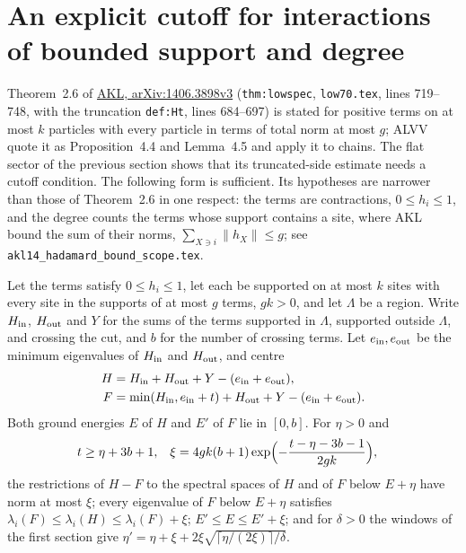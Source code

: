 \documentclass{article}
\begin{document}
\section{An explicit cutoff for interactions of bounded support and degree}

Theorem~2.6 of
\href{https://arxiv.org/pdf/1406.3898}{AKL, arXiv:1406.3898v3}
(\texttt{thm:lowspec}, \texttt{low70.tex}, lines 719--748, with the truncation
\texttt{def:Ht}, lines 684--697) is stated for positive terms on at most $k$
particles with every particle in terms of total norm at most $g$; ALVV quote it
as Proposition~4.4 and Lemma~4.5 and apply it to chains. The flat sector of
the previous section shows that its truncated-side estimate needs a cutoff
condition. The following form is sufficient. Its hypotheses are narrower than
those of Theorem~2.6 in one respect: the terms are contractions, $0\le h_i\le1$, and
the degree counts the terms whose support contains a site, where AKL bound the sum
of their norms, $\sum_{X\ni i}\lVert h_X\rVert\le g$; see
\texttt{akl14\_hadamard\_bound\_scope.tex}.

Let the terms satisfy $0\le h_i\le1$, let each be supported on at most $k$
sites with every site in the supports of at most $g$ terms, $gk>0$, and let
$\Lambda$ be a region. Write $H_{\rm in}$, $H_{\rm out}$ and $Y$ for the sums
of the terms supported in $\Lambda$, supported outside $\Lambda$, and
crossing the cut, and $b$ for the number of crossing terms. Let
$e_{\rm in},e_{\rm out}$ be the minimum eigenvalues of $H_{\rm in}$ and
$H_{\rm out}$, and centre
\begin{align*}
    H & =H_{\rm in}+H_{\rm out}+Y-(e_{\rm in}+e_{\rm out}), \\
    F & =\min(H_{\rm in},e_{\rm in}+t)+H_{\rm out}+Y-(e_{\rm in}+e_{\rm out}).
\end{align*}
Both ground energies $E$ of $H$ and $E'$ of $F$ lie in $[0,b]$. For $\eta>0$
and
\begin{align*}
    t & \ge\eta+3b+1, &
    \xi & =4gk(b+1)\exp\Bigl(-\frac{t-\eta-3b-1}{2gk}\Bigr),
\end{align*}
the restrictions of $H-F$ to the spectral spaces of $H$ and of $F$ below
$E+\eta$ have norm at most $\xi$; every eigenvalue of $F$ below $E+\eta$
satisfies $\lambda_i(F)\le\lambda_i(H)\le\lambda_i(F)+\xi$; $E'\le E\le
E'+\xi$; and for $\delta>0$ the windows of the first section give
$\eta'=\eta+\xi+2\xi\sqrt{\lceil\eta/(2\xi)\rceil/\delta}$.
\end{document}
